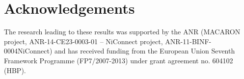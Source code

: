 \documentclass{article}
\begin{document}
\section*{Acknowledgements} The research leading to these results was
supported by the ANR (MACARON project, ANR-14-CE23-0003-01 -- NiConnect
project, ANR-11-BINF-0004NiConnect) and has received funding from the
European Union Seventh Framework Programme (FP7/2007-2013) under grant
agreement no. 604102 (HBP).



\end{document}
